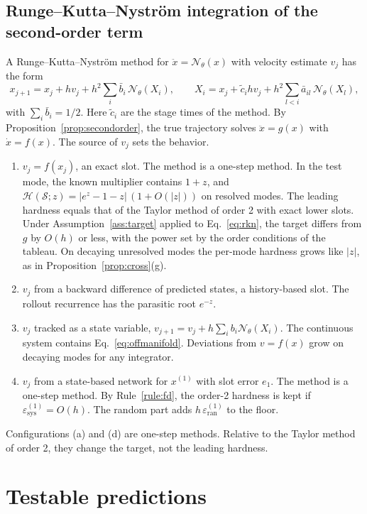\documentclass[11pt]{article}
\theoremstyle{definition}
\theoremstyle{remark}
\newcommand{\Net}{\mathcal{N}_\theta}    %
\newcommand{\Meth}{\mathcal{S}}          %
\newcommand{\Hard}{\mathcal{H}}          %
\newcommand{\sys}{\mathrm{sys}}
\newcommand{\ran}{\mathrm{ran}}
\begin{document}
\subsection{Runge--Kutta--Nystr\"om integration of the second-order term}\label{sec:rkn}
A Runge--Kutta--Nystr\"om method for $\ddot x = \Net(x)$ with velocity estimate $v_j$ has the form
\begin{equation}\label{eq:rkn}
x_{j+1} = x_j + h v_j + h^2 \sum_i \bar b_i\, \Net(X_i), \qquad X_i = x_j + \tilde c_i h v_j + h^2 \sum_{l<i} \bar a_{il}\, \Net(X_l),
\end{equation}
with $\sum_i \bar b_i = 1/2$.
Here $\tilde c_i$ are the stage times of the method.
By Proposition~\ref{prop:secondorder}, the true trajectory solves $\ddot x = g(x)$ with $\dot x = f(x)$.
The source of $v_j$ sets the behavior.
\begin{enumerate}[label=(\alph*)]
\item $v_j = f(x_j)$, an exact slot.
The method is a one-step method.
In the test mode, the known multiplier contains $1 + z$, and $\Hard(\Meth; z) = |e^z - 1 - z|\,(1 + O(|z|))$ on resolved modes.
The leading hardness equals that of the Taylor method of order 2 with exact lower slots.
Under Assumption~\ref{ass:target} applied to Eq.~\eqref{eq:rkn}, the target differs from $g$ by $O(h)$ or less, with the power set by the order conditions of the tableau.
On decaying unresolved modes the per-mode hardness grows like $|z|$, as in Proposition~\ref{prop:cross}(g).
\item $v_j$ from a backward difference of predicted states, a history-based slot.
The rollout recurrence has the parasitic root $e^{-z}$.
\item $v_j$ tracked as a state variable, $v_{j+1} = v_j + h\sum_i b_i \Net(X_i)$.
The continuous system contains Eq.~\eqref{eq:offmanifold}.
Deviations from $v = f(x)$ grow on decaying modes for any integrator.
\item $v_j$ from a state-based network for $x^{(1)}$ with slot error $e_1$.
The method is a one-step method.
By Rule~\ref{rule:fd}, the order-2 hardness is kept if $\varepsilon^{(1)}_\sys = O(h)$.
The random part adds $h\,\varepsilon^{(1)}_\ran$ to the floor.
\end{enumerate}
Configurations (a) and (d) are one-step methods.
Relative to the Taylor method of order 2, they change the target, not the leading hardness.

\section{Testable predictions}\label{sec:predictions}
\end{document}
